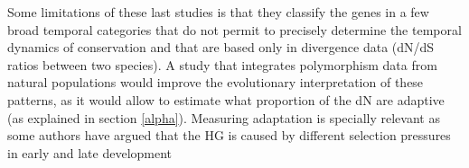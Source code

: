 Some limitations of these last studies is that they classify the genes in a few broad temporal categories that do not permit to precisely determine the temporal dynamics of conservation and that are based only in divergence data (dN/dS ratios between two species).
A study that integrates polymorphism data from natural populations would improve the evolutionary interpretation of these patterns, as it would allow to estimate what proportion of the dN are adaptive (as explained in section \ref{alpha}).
Measuring adaptation is specially relevant as some authors have argued that the HG is caused by different selection pressures in early and late development \citep{Slack1993,Kalinka2012,Wray2000}


\clearpage
